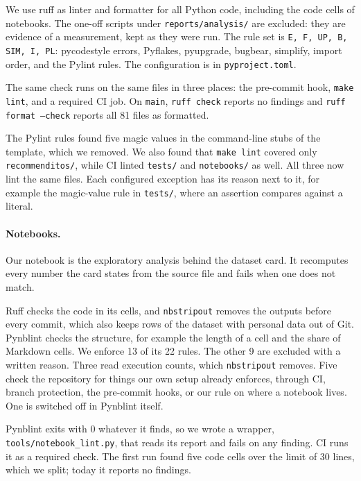 We use ruff as linter and formatter for all Python code, including the code cells of notebooks.
The one-off scripts under \texttt{reports/analysis/} are excluded: they are evidence of a measurement, kept as they were run.
The rule set is \texttt{E, F, UP, B, SIM, I, PL}: pycodestyle errors, Pyflakes, pyupgrade, bugbear, simplify, import order, and the Pylint rules.
The configuration is in \texttt{pyproject.toml}.

The same check runs on the same files in three places: the pre-commit hook, \texttt{make lint}, and a required CI job.
On \texttt{main}, \texttt{ruff check} reports no findings and \texttt{ruff format --check} reports all 81 files as formatted.

The Pylint rules found five magic values in the command-line stubs of the template, which we removed.
We also found that \texttt{make lint} covered only \texttt{recommenditos/}, while CI linted \texttt{tests/} and \texttt{notebooks/} as well. All three now lint the same files.
Each configured exception has its reason next to it, for example the magic-value rule in \texttt{tests/}, where an assertion compares against a literal.

\paragraph{Notebooks.}
Our notebook is the exploratory analysis behind the dataset card.
It recomputes every number the card states from the source file and fails when one does not match.

Ruff checks the code in its cells, and \texttt{nbstripout} removes the outputs before every commit, which also keeps rows of the dataset with personal data out of Git.
Pynblint \cite{quaranta2022pynblint} checks the structure, for example the length of a cell and the share of Markdown cells.
We enforce 13 of its 22 rules.
The other 9 are excluded with a written reason.
Three read execution counts, which \texttt{nbstripout} removes.
Five check the repository for things our own setup already enforces, through CI, branch protection, the pre-commit hooks, or our rule on where a notebook lives.
One is switched off in Pynblint itself.

Pynblint exits with 0 whatever it finds, so we wrote a wrapper, \texttt{tools/notebook\_lint.py}, that reads its report and fails on any finding.
CI runs it as a required check.
The first run found five code cells over the limit of 30 lines, which we split; today it reports no findings.

